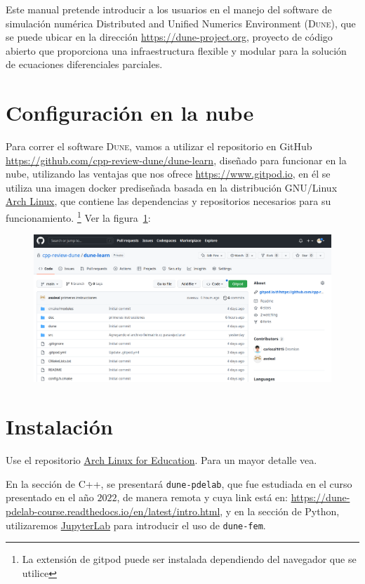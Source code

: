 Este manual pretende introducir a los usuarios en el manejo del
software de simulación numérica Distributed and Unified Numerics
Environment (\textsc{Dune}), que se puede ubicar en la dirección
\url{https://dune-project.org}, proyecto de código abierto que
proporciona una infraestructura flexible y modular para la solución
de ecuaciones diferenciales parciales.

\section{Configuración en la nube}

Para correr el software \textsc{Dune}, vamos a utilizar el
repositorio en GitHub
\url{https://github.com/cpp-review-dune/dune-learn},
diseñado para funcionar en la nube, utilizando las ventajas que nos
ofrece \url{https://www.gitpod.io}, en él se utiliza una imagen
docker prediseñada basada en la distribución GNU/Linux
\href{https://archlinux.org}{Arch Linux}, que contiene las
dependencias y repositorios necesarios para su funcionamiento.
\footnote{
	La extensión de gitpod puede ser instalada dependiendo del
	navegador que se utilice
}
Ver la figura~\ref{fig:github01}:

\begin{figure}[ht!]
	\centering
	\includegraphics[scale=0.3,keepaspectratio]{cppreview-learn.png}
	\label{fig:github01}
\end{figure}

\section{Instalación}

Use el repositorio
\href{https://wiki.archlinux.org/title/Unofficial_user_repositories_(Espa%C3%B1ol)#arch4edu}{Arch Linux for Education}.
Para un mayor detalle vea.

En la sección de C++, se presentará \verb|dune-pdelab|, que fue
estudiada en el curso presentado en el año $2022$, de manera remota y
cuya link está en:
\url{https://dune-pdelab-course.readthedocs.io/en/latest/intro.html},
y en la sección de Python, utilizaremos
\href{https://jupyter.org}{JupyterLab} para introducir el uso de \verb|dune-fem|.